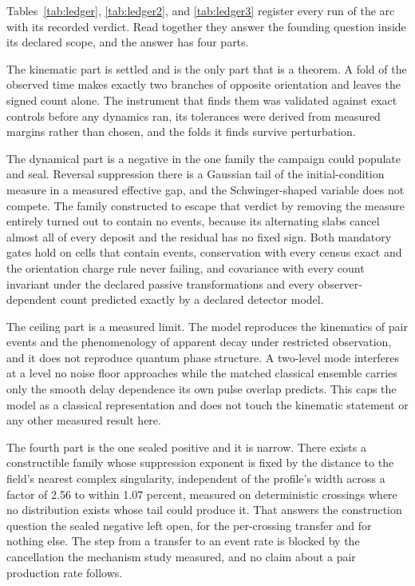 \documentclass[aps,pre,reprint,nofootinbib,floatfix]{revtex4-2}
\begin{document}
Tables~\ref{tab:ledger}, \ref{tab:ledger2}, and \ref{tab:ledger3}
register every run of the arc with its recorded verdict.  Read together
they answer the founding question inside its declared scope, and the
answer has four parts.

The kinematic part is settled and is the only part that is a theorem.
A fold of the observed time makes exactly two branches of opposite
orientation and leaves the signed count alone.  The instrument that
finds them was validated against exact controls before any dynamics
ran, its tolerances were derived from measured margins rather than
chosen, and the folds it finds survive perturbation.

The dynamical part is a negative in the one family the campaign could
populate and seal.  Reversal suppression there is a Gaussian tail of
the initial-condition measure in a measured effective gap, and the
Schwinger-shaped variable does not compete.  The family constructed to
escape that verdict by removing the measure entirely turned out to
contain no events, because its alternating slabs cancel almost all of
every deposit and the residual has no fixed sign.  Both mandatory gates
hold on cells that contain events, conservation with every census exact
and the orientation charge rule never failing, and covariance with
every count invariant under the declared passive transformations and
every observer-dependent count predicted exactly by a declared detector
model.

The ceiling part is a measured limit.  The model reproduces the
kinematics of pair events and the phenomenology of apparent decay under
restricted observation, and it does not reproduce quantum phase
structure.  A two-level mode interferes at a level no noise floor
approaches while the matched classical ensemble carries only the smooth
delay dependence its own pulse overlap predicts.  This caps the model
as a classical representation and does not touch the kinematic
statement or any other measured result here.

The fourth part is the one sealed positive and it is narrow.  There
exists a constructible family whose suppression exponent is fixed by
the distance to the field's nearest complex singularity, independent of
the profile's width across a factor of 2.56 to within 1.07 percent,
measured on deterministic crossings where no distribution exists whose
tail could produce it.  That answers the construction question the
sealed negative left open, for the per-crossing transfer and for
nothing else.  The step from a transfer to an event rate is blocked by
the cancellation the mechanism study measured, and no claim about a
pair production rate follows.
\end{document}
